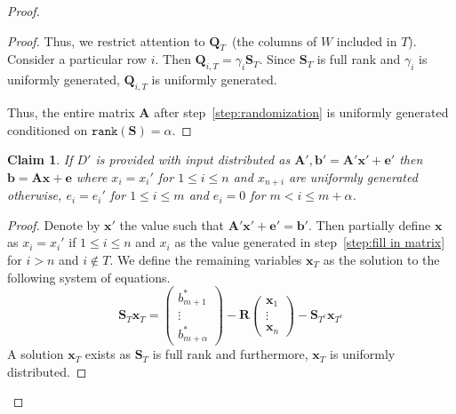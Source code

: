 \documentclass[11pt]{article}
\newcommand{\vect}[1]{\ensuremath{\textbf{#1}}}
\newcommand{\rank}{\ensuremath{\mathtt{rank}}\xspace}
\newtheorem{claim}[theorem]{Claim}
\newcommand{\ve}{\vect{e}}
\newcommand{\vS}{\vect{S}}
\newcommand{\vA}{\vect{A}}
\newcommand{\vQ}{\vect{Q}}
\newcommand{\vR}{\vect{R}}
\newcommand{\vx}{\vect{x}}
\newcommand{\va}{\vect{a}}
\newcommand{\vb}{\vect{b}}
\begin{document}
\begin{proof}
\begin{proof}
Thus, we restrict attention to $\vQ_T$~(the columns of $W$ included in $T$).  Consider a particular row $i$.  Then $\vQ_{i, T} = \gamma_i \vS_{T}$.  Since $\vS_T$ is full rank and $\gamma_i$ is uniformly generated, $\vQ_{i, T}$ is uniformly generated.

Thus, the entire matrix $\vA$ after step~\ref{step:randomization} is uniformly generated conditioned on $\rank(\vS) = \alpha$.
\end{proof}
\begin{claim}
\label{cl:random ax+e}
If $D'$ is provided with input distributed as $\vA', \vb' = \vA'\vx'+\ve'$ then $\vb = \vA \vx+\ve$ where $x_i = x_i'$ for $1\leq i \leq n$ and $x_{n+i}$ are uniformly generated otherwise,  $e_i = e_i'$ for $1\leq i\leq m$ and $e_i = 0$ for $m<i\leq m+\alpha$.
\end{claim}
\begin{proof}
Denote by $\vx'$ the value such that $\vA'\vx'+\ve' = \vb'$.  
Then partially define $\vx$ as $x_i = x_i'$ if $1\leq i \leq n$ and $x_i$ as the value generated in step~\ref{step:fill in matrix} for $i>n $ and $i\not\in T$.  We define the remaining variables $\vx_T$ as the solution to the following system of equations.
\[
\vS_T  \vx_T = \begin{pmatrix} b_{m+1}^*  \\ \vdots \\b_{m+\alpha}^* \end{pmatrix}  - \vR \begin{pmatrix} \vx_1  \\ \vdots \\\vx_n \end{pmatrix}- \vS_{T^c} \vx_{T^c}  
\]
A solution $\vx_T$ exists as $\vS_T$ is full rank and furthermore, $\vx_T$ is uniformly distributed.

\end{proof}
\end{proof}
\end{document}
